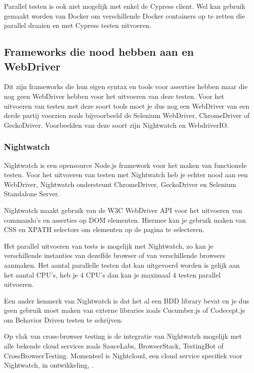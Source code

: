 Parallel testen is ook niet mogelijk met enkel de Cypress client. Wel kan gebruik gemaakt worden van Docker om verschillende Docker containers op te zetten die parallel draaien en met Cypress testen uitvoeren.

\subsection{Frameworks die nood hebben aan en WebDriver}

Dit zijn frameworks die hun eigen syntax en tools voor \glspl{assertie} hebben maar die nog geen \gls{WebDriver} hebben voor het uitvoeren van deze testen. Voor het uitvoeren van testen met deze soort tools moet je dus nog een WebDriver van een derde partij voorzien zoals bijvoorbeeld de Selenium WebDriver, ChromeDriver of GeckoDriver. Voorbeelden van deze soort zijn Nightwatch en WebdriverIO.

\subsubsection{Nightwatch}

Nightwatch is een opensource Node.js framework voor het maken van functionele testen. Voor het uitvoeren van testen met Nightwatch heb je echter nood aan een WebDriver, Nightwatch ondersteunt ChromeDriver, GeckoDriver en Selenium Standalone Server.

Nightwatch maakt gebruik van de W3C WebDriver API voor het uitvoeren van commando's en asserties op DOM elementen. Hiermee kan je gebruik maken van CSS en XPATH selectors om elementen op de pagina te selecteren.

Het parallel uitvoeren van tests is mogelijk met Nightwatch, zo kan je verschillende instanties van dezelfde browser of van verschillende browsers aanmaken. Het aantal parallelle testen dat kan uitgevoerd worden is gelijk aan het aantal CPU's, heb je 4 CPU's dan kan je maximaal 4 testen parallel uitvoeren.

Een ander kenmerk van Nightwatch is dat het al een BDD library bevat en je dus geen gebruik moet maken van externe libraries zoals Cucumber.js of Codecept.js om Behavior Driven testen te schrijven.

Op vlak van cross-browser testing is de integratie van Nightwatch mogelijk met alle bekende cloud services zoals SauceLabs, BrowserStack, TestingBot of CrossBrowserTesting. Momenteel is Nightcloud, een cloud service specifiek voor Nightwatch, in ontwikkeling, \textcite{Nightcloud2017}.


